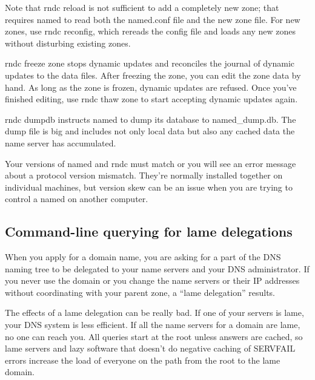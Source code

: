 Note that {rndc} {reload} is not sufficient to add a completely new
zone; that requires {named} to read both the {named.conf} file and the
new zone file. For new zones, use {rndc reconfig}, which rereads the
config file and loads any new zones without disturbing existing zones.

{rndc} {freeze} {zone} stops dynamic updates and reconciles the journal
of dynamic
\protect\hypertarget{part0024_split_071.htmlux5cux23_idIndexMarker2294}{}{}updates
to the data files. After freezing the zone, you can edit the zone data
by hand. As long as the zone is frozen, dynamic updates are refused.
Once you've finished editing, use {rndc thaw} {zone} to start accepting
dynamic updates again.

{rndc dumpdb} instructs {named} to dump its database to
{named\_dump.db}. The dump file is big and includes not only local data
but also any cached data the name server has accumulated.

Your versions of {named} and {rndc} must match or you will see an error
message about a protocol version mismatch. They're normally installed
together on individual machines, but version skew can be an issue when
you are trying to control a {named} on another computer.

\protect\hypertarget{part0024_split_072.html}{}{}

\hypertarget{part0024_split_072.htmlux5cux23_idContainer1069}{}
\hypertarget{part0024_split_072.htmlux5cux23calibre_pb_71}{%
\subsection[Command-line querying for lame
delegations]{\texorpdfstring{\protect\hypertarget{part0024_split_072.htmlux5cux23_idTextAnchor966}{}{}Command-line
querying for lame
delegations}{Command-line querying for lame delegations}}\label{part0024_split_072.htmlux5cux23calibre_pb_71}}

\protect\hypertarget{part0024_split_072.htmlux5cux23_idIndexMarker2295}{}{}\protect\hypertarget{part0024_split_072.htmlux5cux23_idIndexMarker2296}{}{}When
you apply for a domain name, you are asking for a part of the DNS naming
tree to be delegated to your name servers and your DNS administrator. If
you never use the domain or you change the name servers or their IP
addresses without coordinating with your parent zone, a ``lame
delegation'' results.

The effects of a lame delegation can be really bad. If one of your
servers is lame, your DNS system is less efficient. If all the name
servers for a domain are lame, no one can reach you. All queries start
at the root unless answers are cached, so lame servers and lazy software
that doesn't do negative caching of
\protect\hypertarget{part0024_split_072.htmlux5cux23_idIndexMarker2297}{}{}SERVFAIL
errors increase the load of everyone on the path from the root to the
lame domain.


